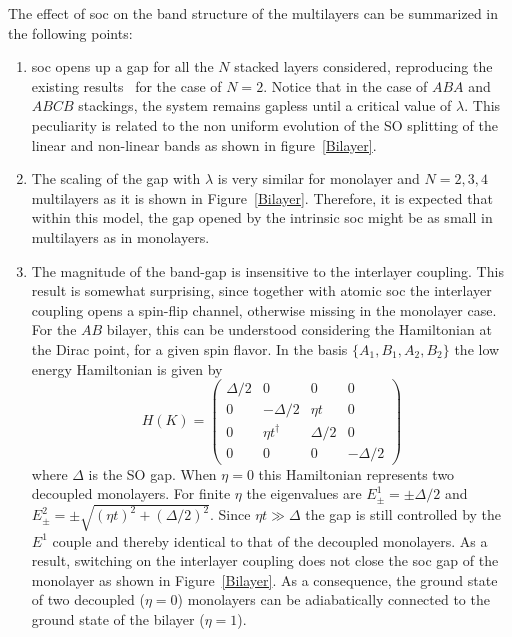 The effect of \ac{soc} on the band structure of the multilayers can be summarized in the following points:
\begin{enumerate}
\item \ac{soc}  opens up a gap for all the $N$ stacked layers considered, reproducing the existing results~\cite{Guinea2010} for the case of $N=2$.
Notice that in the case of $ABA$ and $ABCB$ stackings, the system remains gapless until a critical value of $\lambda$.
This peculiarity is related to the non uniform evolution of the SO splitting of the linear and non-linear bands  as shown in figure~\ref{Bilayer}.


\item  The scaling of the gap with $\lambda$ is very similar for monolayer and $N=2,3,4$ multilayers as it is shown in Figure~\ref{Bilayer}. Therefore, it is expected that within this model, the gap opened by the intrinsic \ac{soc} might be as small in multilayers as in monolayers.

\item The magnitude of the band-gap is insensitive to the interlayer coupling. This result is somewhat surprising, since together with atomic \ac{soc} the interlayer coupling opens a spin-flip channel, otherwise missing in the monolayer case.
For the $AB$ bilayer, this can be understood considering the Hamiltonian at the Dirac point, for a given spin flavor. In the basis $\{A_{1},B_{1},A_{2},B_{2}\}$
the low energy Hamiltonian is given by
\begin{equation}
H(K) = \left(\begin{array}{cccc}
\Delta/2 &     0   &    0   &     0 \\
   0   & -\Delta/2 &  \eta t  &     0 \\
   0   &\eta t^{\dagger}&\Delta/2&  0 \\
   0   &     0   &    0   & -\Delta/2
   \end{array}\right)
\end{equation}
where $\Delta$ is the SO gap. When $\eta=0$ this Hamiltonian represents two decoupled monolayers.
For finite $\eta$ the eigenvalues are $E^{1}_{\pm}=\pm\Delta/2$ and $E^{2}_{\pm}=\pm\sqrt{(\eta t)^{2}+(\Delta/2)^{2}}$.
Since $\eta t\gg\Delta$ the gap is still controlled by the $E^{1}$ couple and thereby identical to that of the decoupled monolayers.
As a result, switching on the interlayer coupling does not close the \ac{soc} gap of the monolayer as shown in Figure~\ref{Bilayer}. As a consequence,  the ground state of two decoupled ($\eta=0$) monolayers can be adiabatically connected to the ground state of the bilayer ($\eta=1$).
\end{enumerate}

